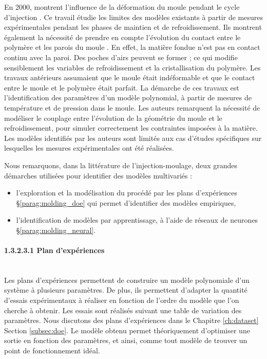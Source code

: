 En 2000, \citeauthor{delaunay_nature_2000} montrent l'influence de la déformation du moule pendant le cycle d'injection \cite{delaunay_nature_2000}.
Ce travail étudie les limites des modèles existants à partir de mesures expérimentales pendant les phases de maintien et de refroidissement.
Ils montrent également la nécessité de prendre en compte l'évolution du contact entre le polymère et les parois du moule \cite{delaunay_nature_2000a}.
En effet, la matière fondue n'est pas en contact continu avec la paroi.
Des poches d'airs peuvent se former ; ce qui modifie sensiblement les variables de refroidissement et la cristallisation du polymère.
Les travaux antérieurs assumaient que le moule était indéformable et que le contact entre le moule et le polymère était parfait.
La démarche de ces travaux est l'identification des paramètres d'un modèle polynomial, à partir de mesures de température et de pression dans le moule.
Les auteurs remarquent la nécessité de modéliser le couplage entre l'évolution de la géométrie du moule et le refroidissement, pour simuler correctement les contraintes imposées à la matière.
Les modèles identifiés par les auteurs sont limités aux cas d'études spécifiques sur lesquelles les mesures expérimentales ont été réalisées.

Nous remarquons, dans la littérature de l'injection-moulage, deux grandes démarches utilisées pour identifier des modèles multivariés :
\begin{itemize}
\item l'exploration et la modélisation du procédé par les plans d'expériences §\ref{parag:molding_doe} qui permet d'identifier des modèles empiriques,
\item l'identification de modèles par apprentissage, à l'aide de réseaux de neurones §\ref{parag:molding_neural}.
\end{itemize}

\paragraph{1.3.2.3.1 Plan d'expériences}\mbox{} \label{parag:molding_doe} \\
Les plans d’expériences permettent de construire un modèle polynomiale d’un système à plusieurs paramètres.
De plus, ils permettent d'adapter la quantité d’essais expérimentaux à réaliser en fonction de l'ordre du modèle que l'on cherche à obtenir.
Les essais sont réalisés suivant une table de variation des paramètres.
Nous discutons des plans d'expériences dans le Chapitre \ref{ch:dataset} Section \ref{subsec:doe}.
Le modèle obtenu permet théoriquement d'optimiser une sortie en fonction des paramètres, et ainsi, comme tout modèle de trouver un point de fonctionnement idéal.

